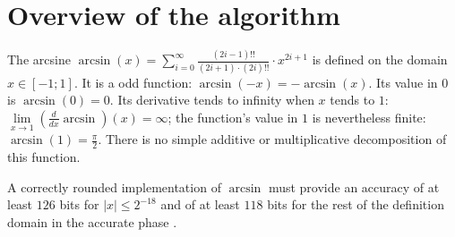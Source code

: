 \section{Overview of the algorithm\label{sec:asin-overview}}
The arcsine $\arcsin\left( x \right) = \sum\limits_{i=0}^{\infty}
\frac{\left( 2i - 1 \right)!!}{\left(2i+1\right) \cdot \left( 2i
\right)!!} \cdot x^{2i+1}$ is defined on the domain $x \in \left[ -1;
1 \right]$. It is a odd function: $\arcsin\left(-x\right) =
-\arcsin\left( x \right)$. Its value in $0$ is $\arcsin\left( 0
\right) = 0$. Its derivative tends to infinity when $x$ tends to $1$:
$\lim\limits_{x \rightarrow 1} \left( \frac{d}{dx} \arcsin
\right)\left(x\right) = \infty$; the function's value in $1$ is
nevertheless finite: $\arcsin\left( 1 \right) = \frac{\pi}{2}$.  There
is no simple additive or multiplicative decomposition of this
function.

A correctly rounded implementation of $\arcsin$ must provide an
accuracy of at least $126$ bits for $\left \vert x \right \vert \leq
2^{-18}$ and of at least $118$ bits for the rest of the definition
domain in the accurate phase \cite{DinDefLau2004LIP}.

